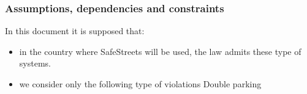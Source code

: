 \subsubsection{Assumptions, dependencies and constraints}
	In this document it is supposed that:
\begin{itemize}
	\item 
	in the country where SafeStreets will be used, the law admits these type of systems.
	
	\item 
	we consider only the following type of violations
	\subitem
	Double parking
	\subitem
\end{itemize}



